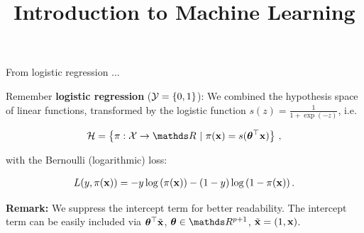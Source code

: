 \documentclass[11pt,compress,t,notes=noshow, xcolor=table]{beamer}
\title{Introduction to Machine Learning}
\date{}
\begin{document}

\sloppy


\begin{vbframe}{From logistic regression ...}

Remember \textbf{logistic regression} ($\mathcal{Y} = \{0, 1\}$): We combined the hypothesis space of linear functions, transformed by the logistic function $s(z) = \frac{1}{1 + \exp(- z)}$, i.e.\

\vspace*{-0.3cm}

\begin{eqnarray*}
  \Hspace = \left\{\pi: \Xspace \to \R ~|~\pix = s(\thetab^\top \xv)\right\}\,,
\end{eqnarray*}

with the Bernoulli (logarithmic) loss: 

\begin{eqnarray*}
  L(y, \pi(\mathbf{x})) = -y \log \left(\pi(\mathbf{x})\right) - (1 - y) \log \left(1 - \pi(\mathbf{x})\right).
\end{eqnarray*}

\vfill

\begin{footnotesize}
  \textbf{Remark:} We suppress the intercept term for better readability. The intercept term can be easily included via $\bm{\theta}^\top \tilde{\mathbf{x}}$, $\thetab \in \R^{p + 1}$, $\tilde{\mathbf{x}} = (1, \mathbf{x})$.
\end{footnotesize}

\end{vbframe}
\end{document}
